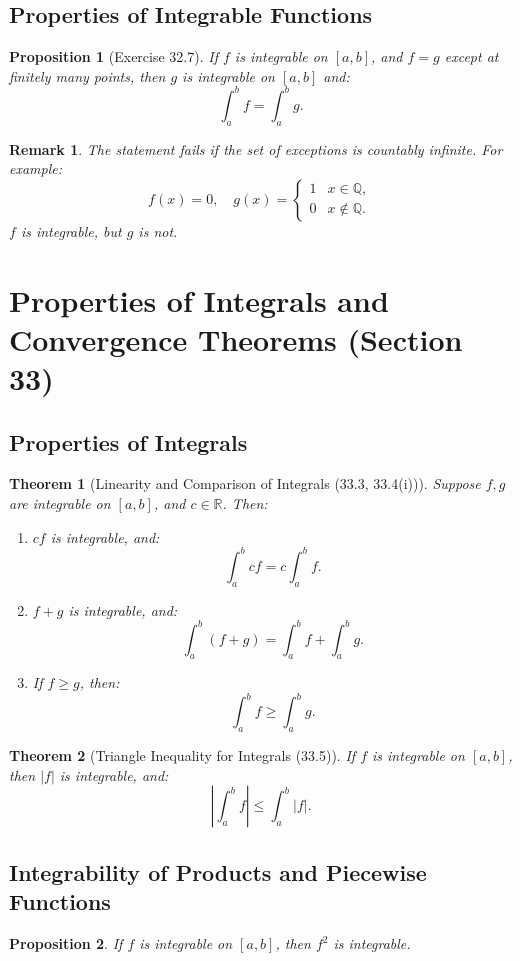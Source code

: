 \documentclass[9pt]{article}
\theoremstyle{definition}
\theoremstyle{plain}
\newtheorem{theorem}{Theorem}
\newtheorem{proposition}{Proposition}
\newtheorem{remark}{Remark}
\begin{document}
\subsection*{Properties of Integrable Functions}
\begin{proposition}[Exercise 32.7]
If \( f \) is integrable on \( [a, b] \), and \( f = g \) except at finitely many points, then \( g \) is integrable on \( [a, b] \) and:
\[
\int_a^b f = \int_a^b g.
\]
\end{proposition}

\begin{remark}
The statement fails if the set of exceptions is countably infinite. For example:
\[
f(x) = 0, \quad g(x) =
\begin{cases}
1 & x \in \mathbb{Q}, \\
0 & x \notin \mathbb{Q}.
\end{cases}
\]
\( f \) is integrable, but \( g \) is not.
\end{remark}
\section*{Properties of Integrals and Convergence Theorems (Section 33)}

\subsection*{Properties of Integrals}
\begin{theorem}[Linearity and Comparison of Integrals (33.3, 33.4(i))]
Suppose \( f, g \) are integrable on \( [a, b] \), and \( c \in \mathbb{R} \). Then:
\begin{enumerate}
    \item \( cf \) is integrable, and:
    \[
    \int_a^b cf = c \int_a^b f.
    \]
    \item \( f + g \) is integrable, and:
    \[
    \int_a^b (f + g) = \int_a^b f + \int_a^b g.
    \]
    \item If \( f \geq g \), then:
    \[
    \int_a^b f \geq \int_a^b g.
    \]
\end{enumerate}
\end{theorem}

\begin{theorem}[Triangle Inequality for Integrals (33.5)]
If \( f \) is integrable on \( [a, b] \), then \( |f| \) is integrable, and:
\[
\left| \int_a^b f \right| \leq \int_a^b |f|.
\]
\end{theorem}

\subsection*{Integrability of Products and Piecewise Functions}
\begin{proposition}
If \( f \) is integrable on \( [a, b] \), then \( f^2 \) is integrable.
\end{proposition}
\end{document}
